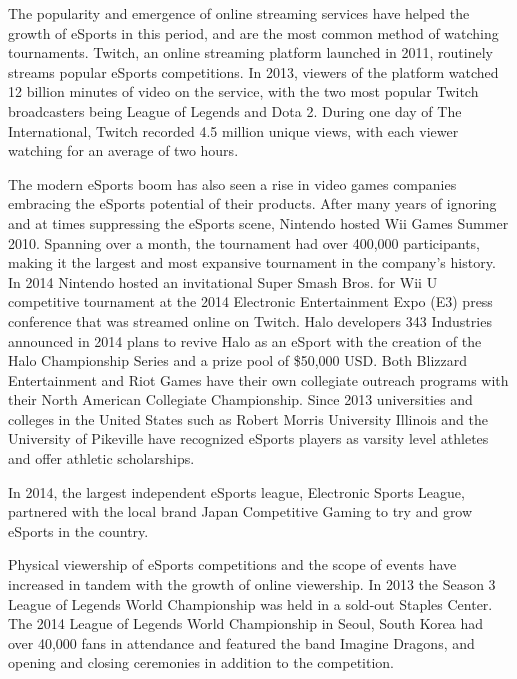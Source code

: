 		
		The popularity and emergence of online streaming services have helped the growth of eSports in this period, and are the most common method of watching tournaments. Twitch, an online streaming platform launched in 2011, routinely streams popular eSports competitions. In 2013, viewers of the platform watched 12 billion minutes of video on the service, with the two most popular Twitch broadcasters being League of Legends and Dota 2. During one day of The International, Twitch recorded 4.5 million unique views, with each viewer watching for an average of two hours.
		
		The modern eSports boom has also seen a rise in video games companies embracing the eSports potential of their products. After many years of ignoring and at times suppressing the eSports scene, Nintendo hosted Wii Games Summer 2010. Spanning over a month, the tournament had over 400,000 participants, making it the largest and most expansive tournament in the company's history. In 2014 Nintendo hosted an invitational Super Smash Bros. for Wii U competitive tournament at the 2014 Electronic Entertainment Expo (E3) press conference that was streamed online on Twitch. Halo developers 343 Industries announced in 2014 plans to revive Halo as an eSport with the creation of the Halo Championship Series and a prize pool of \$50,000 USD. Both Blizzard Entertainment and Riot Games have their own collegiate outreach programs with their North American Collegiate Championship. Since 2013 universities and colleges in the United States such as Robert Morris University Illinois and the University of Pikeville have recognized eSports players as varsity level athletes and offer athletic scholarships.
		
		In 2014, the largest independent eSports league, Electronic Sports League, partnered with the local brand Japan Competitive Gaming to try and grow eSports in the country.
		
		Physical viewership of eSports competitions and the scope of events have increased in tandem with the growth of online viewership. In 2013 the Season 3 League of Legends World Championship was held in a sold-out Staples Center. The 2014 League of Legends World Championship in Seoul, South Korea had over 40,000 fans in attendance and featured the band Imagine Dragons, and opening and closing ceremonies in addition to the competition.
	
		\newpage
